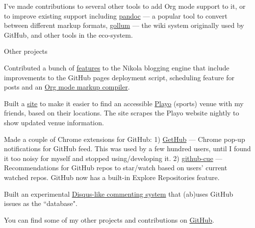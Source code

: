\begin{cventries}
{\begin{cvitems}
        \item I've made contributions to several other tools to add Org mode support to it, or to improve existing support including \href{https://github.com/jgm/pandoc/commits?author=punchagan}{pandoc} --- a popular tool to convert between different markup formats, \href{https://github.com/gollum/gollum/commits?author=punchagan}{gollum} --- the wiki system originally used by GitHub, and other tools in the eco-system.
        \end{cvitems}
      }
  \cventry
      {Other projects}
      {}
      {} %
      {} %
      {
        \begin{cvitems} %
        \item {Contributed a bunch of \href{https://github.com/getnikola/nikola/commits?author=punchagan}{features} to the Nikola blogging engine that include improvements to the GitHub pages deployment script, scheduling feature for posts and an \href{https://github.com/getnikola/plugins/tree/master/v8/orgmode}{Org mode markup compiler}.}
        \item {Built a \href{https://punchagan.github.io/playo-find-venue/}{site} to make it easier to find an accessible \href{https://playo.co/}{Playo} (sports) venue with my friends, based on their locations. The site scrapes the Playo website nightly to show updated venue information.}
        \item {Made a couple of Chrome extensions for GitHub: 1) \href{https://github.com/punchagan/GetHub}{GetHub} --- Chrome pop-up notifications for GitHub feed. This was used by a few hundred users, until I found it too noisy for myself and stopped using/developing it. 2) \href{https://github.com/punchagan/github-cue}{github-cue} --- Recommendations for GitHub repos to star/watch based on users' current watched repos. GitHub now has a built-in Explore Repositories feature.}
        \item {Built an experimental \href{https://github.com/punchagan/crumb}{Disqus-like commenting system} that (ab)uses GitHub issues as the ``database".}
        \item {You can find some of my other projects and contributions on \href{https://github.com/punchagan}{GitHub}.}
        \end{cvitems}
      }
\end{cventries}
